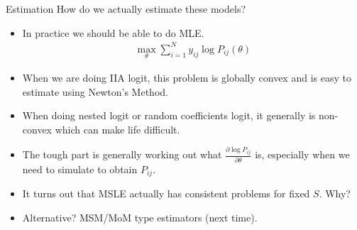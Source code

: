 \documentclass[xcolor=pdftex,dvipsnames,table,mathserif]{beamer}
\begin{document}
\begin{frame}{Estimation}
How do we actually estimate these models?
\begin{itemize}
\item In practice we should be able to do MLE.
\begin{eqnarray*}
\max_{\theta} \sum_{i=1}^N y_{ij} \log P_{ij}(\theta)
\end{eqnarray*}
\item When we are doing IIA logit, this problem is globally convex and is easy to estimate using Newton's Method.
\item When doing nested logit or random coefficients logit, it generally is non-convex which can make life difficult.
\item The tough part is generally working out what $\frac{\partial \log P_{ij}}{\partial \theta}$ is, especially when we need to simulate to obtain $P_{ij}$.
\item It turns out that MSLE actually has consistent problems for fixed $S$. Why?
\item Alternative? MSM/MoM type estimators (next time).
\end{itemize}
\end{frame}




\end{document}
